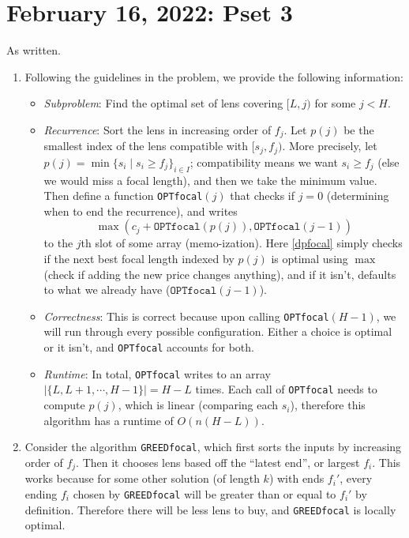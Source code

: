 \section{February 16, 2022: Pset 3} 
\begin{prob}
    As written.
\end{prob}
\begin{solution}
    \begin{enumerate}[label=(\alph*)]
    \setlength\itemsep{-.2em}
        \item 
    Following the guidelines in the problem, we provide the following information:
    \begin{itemize}
    \setlength\itemsep{-.2em}
        \item \emph{Subproblem}: Find the optimal set of lens covering $[L,j)$ for some $j<H$.
        \item  \emph{Recurrence}: Sort the lens in increasing order of $f_j $. Let $p(j)$ be the smallest index of the lens compatible with $[s_j ,f_j )$. More precisely, let $p(j)=\min \{s _i \mid s_i \geq f_j \}_{i \in I} $; compatibility means we want $s_i  \geq f_j $ (else we would miss a focal length), and then we take the minimum value. Then define a function \texttt{OPTfocal}$(j)$ that checks if $j=0$ (determining when to end the recurrence), and writes 
            \begin{equation}\label{dpfocal} 
                \max(c_j  +\texttt{OPTfocal}(p(j)),\texttt{OPTfocal}(j-1))
            \end{equation}
            to the $j$th slot of some array (memo-ization). Here \cref{dpfocal} simply checks if the next best focal length indexed by $p(j)$ is optimal using $\max$ (check if adding the new price changes anything), and if it isn't, defaults to what we already have ($\texttt{OPTfocal}(j-1)$).
        \item \emph{Correctness}: This is correct because upon calling \texttt{OPTfocal}$(H-1)$, we will run through every possible configuration. Either a choice is optimal or it isn't, and  \texttt{OPTfocal} accounts for both.
        \item \emph{Runtime}: In total, \texttt{OPTfocal} writes to an array $|\{L,L+1,\cdots ,H-1\}|=H-L $ times. Each call of \texttt{OPTfocal} needs to compute $p(j)$, which is linear (comparing each  $s_i $), therefore this algorithm has a runtime of $O(n(H-L))$.
    \end{itemize}

\item Consider the algorithm \texttt{GREEDfocal}, which first sorts the inputs by increasing order of $f_j $. Then it chooses lens based off the ``latest end'', or largest $f_i $. This works because for some other solution (of length $k$) with ends $f_i '$, every ending $f_i $ chosen by \texttt{GREEDfocal} will be greater than or equal to $f_i '$ by definition. Therefore there will be less lens to buy, and \texttt{GREEDfocal} is locally optimal.
    \end{enumerate}
\end{solution}

